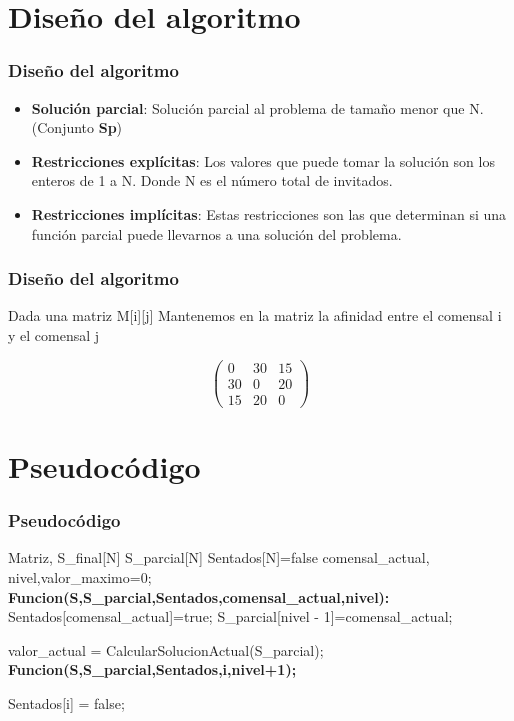\documentclass{beamer}
\begin{document}
\section{Diseño del algoritmo} 
\begin{frame}
	\frametitle{Diseño del algoritmo}
	\begin{itemize}
		\item \textbf{Solución parcial}: Solución parcial al problema de tamaño menor que N. (Conjunto \textbf{Sp})
		\item \textbf{Restricciones explícitas}: Los valores que puede tomar la solución son los enteros de 1 a N. Donde N es el número total de invitados.  
		\item \textbf{Restricciones implícitas}: Estas restricciones son las que determinan si una función parcial puede llevarnos a una solución del problema.
	\end{itemize}
	
\end{frame}


\begin{frame}
		\frametitle{Diseño del algoritmo}
	Dada una matriz M[i][j] 
	Mantenemos en la matriz la afinidad  entre 
	el comensal i y el comensal j
	

\[ \left( \begin{array}{ccc}
0 & 30 & 15 \\
30 & 0 & 20 \\
15 & 20 & 0 \end{array} \right)\] 
\end{frame}

\section{Pseudocódigo}

\begin{frame}
		\frametitle{Pseudocódigo}
		\footnotesize{	
		\begin{algorithmic}				
			\Require Matriz, S\_final[N] S\_parcial[N] Sentados[N]={false} comensal\_actual, nivel,valor\_maximo=0;
			\State \textbf{Funcion(S,S\_parcial,Sentados,comensal\_actual,nivel):}
				\State Sentados[comensal\_actual]=true;
				\State	   S\_parcial[nivel - 1]=comensal\_actual;
	
				\State 	valor\_actual = CalcularSolucionActual(S\_parcial);
				\State 	\textbf{Funcion(S,S\_parcial,Sentados,i,nivel+1);}
					\EndIf
				\EndIf
				
				\State Sentados[i] = false;
				\EndIf
				\EndFor
				
				
			\end{algorithmic}	
		}
\end{frame}
\end{document}
